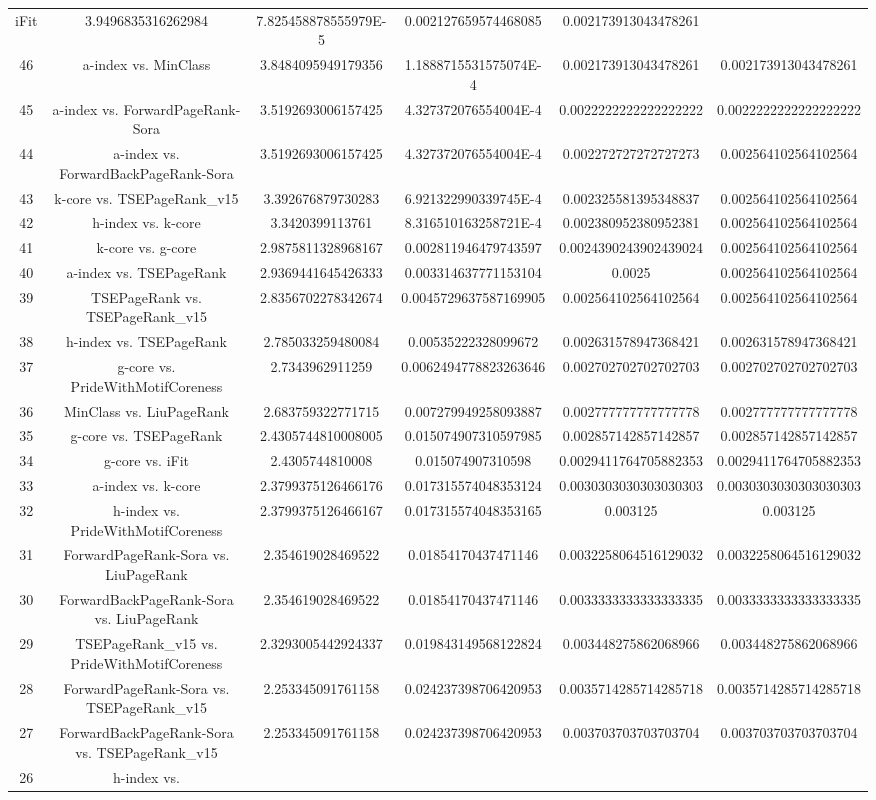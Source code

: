 \documentclass[a4paper,10pt]{article}
\begin{document}
\begin{landscape}
\begin{table}[!htp]
\begin{tabular}{cccccc}
iFit&3.9496835316262984&7.825458878555979E-5&0.002127659574468085&0.002173913043478261\\46&a-index vs. MinClass&3.8484095949179356&1.1888715531575074E-4&0.002173913043478261&0.002173913043478261\\45&a-index vs. ForwardPageRank-Sora&3.5192693006157425&4.327372076554004E-4&0.0022222222222222222&0.0022222222222222222\\44&a-index vs. ForwardBackPageRank-Sora&3.5192693006157425&4.327372076554004E-4&0.002272727272727273&0.002564102564102564\\43&k-core vs. TSEPageRank_v15&3.392676879730283&6.921322990339745E-4&0.002325581395348837&0.002564102564102564\\42&h-index vs. k-core&3.3420399113761&8.316510163258721E-4&0.002380952380952381&0.002564102564102564\\41&k-core vs. g-core&2.9875811328968167&0.002811946479743597&0.0024390243902439024&0.002564102564102564\\40&a-index vs. TSEPageRank&2.9369441645426333&0.003314637771153104&0.0025&0.002564102564102564\\39&TSEPageRank vs. TSEPageRank_v15&2.8356702278342674&0.0045729637587169905&0.002564102564102564&0.002564102564102564\\38&h-index vs. TSEPageRank&2.785033259480084&0.00535222328099672&0.002631578947368421&0.002631578947368421\\37&g-core vs. PrideWithMotifCoreness&2.7343962911259&0.0062494778823263646&0.002702702702702703&0.002702702702702703\\36&MinClass vs. LiuPageRank&2.683759322771715&0.007279949258093887&0.002777777777777778&0.002777777777777778\\35&g-core vs. TSEPageRank&2.4305744810008005&0.015074907310597985&0.002857142857142857&0.002857142857142857\\34&g-core vs. iFit&2.4305744810008&0.015074907310598&0.0029411764705882353&0.0029411764705882353\\33&a-index vs. k-core&2.3799375126466176&0.017315574048353124&0.0030303030303030303&0.0030303030303030303\\32&h-index vs. PrideWithMotifCoreness&2.3799375126466167&0.017315574048353165&0.003125&0.003125\\31&ForwardPageRank-Sora vs. LiuPageRank&2.354619028469522&0.01854170437471146&0.0032258064516129032&0.0032258064516129032\\30&ForwardBackPageRank-Sora vs. LiuPageRank&2.354619028469522&0.01854170437471146&0.0033333333333333335&0.0033333333333333335\\29&TSEPageRank_v15 vs. PrideWithMotifCoreness&2.3293005442924337&0.019843149568122824&0.003448275862068966&0.003448275862068966\\28&ForwardPageRank-Sora vs. TSEPageRank_v15&2.253345091761158&0.024237398706420953&0.0035714285714285718&0.0035714285714285718\\27&ForwardBackPageRank-Sora vs. TSEPageRank_v15&2.253345091761158&0.024237398706420953&0.003703703703703704&0.003703703703703704\\26&h-index vs. 
\end{tabular}
\end{table}
\end{landscape}
\end{document}
